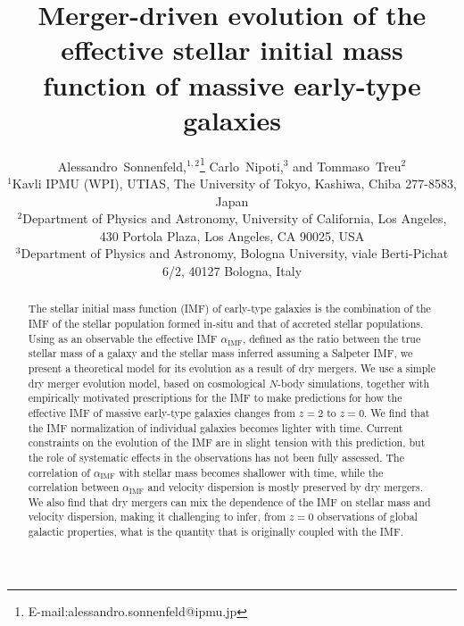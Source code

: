 \documentclass[usenatbib]{mnras}
\def\aimf{\alpha_{\mathrm{IMF}}}
\begin{document}
\title[Evolution of the stellar initial mass function of early-type galaxies]{Merger-driven evolution of the effective stellar initial mass function of massive early-type galaxies}
\author[Sonnenfeld et al.]{
Alessandro~Sonnenfeld,$^{1,2}$\thanks{E-mail:alessandro.sonnenfeld@ipmu.jp}
Carlo~Nipoti,$^{3}$
and Tommaso~Treu$^{2}$
\\
$^{1}$Kavli IPMU (WPI), UTIAS, The University of Tokyo, Kashiwa, Chiba 277-8583, Japan \\
$^{2}$Department of Physics and Astronomy, University of California, Los Angeles, 430 Portola Plaza, Los Angeles, CA 90025, USA \\
$^{3}$Department of Physics and Astronomy, Bologna University, viale Berti-Pichat 6/2, 40127 Bologna, Italy
}

\maketitle

\begin{abstract}
The stellar initial mass function (IMF) of early-type galaxies is the
combination of the IMF of the stellar population formed in-situ and
that of accreted stellar populations.  Using as an observable the
  effective IMF $\aimf$, defined as the ratio between the true stellar
  mass of a galaxy and the stellar mass inferred assuming a Salpeter
  IMF, we present a theoretical model for its evolution as a result
of dry mergers.  We use a simple dry merger evolution model, 
  based on cosmological $N$-body simulations, together with
empirically motivated prescriptions for the IMF to make predictions
for how the effective IMF of massive early-type galaxies changes from
$z=2$ to $z=0$.  We find that the IMF normalization of individual
galaxies becomes lighter with time.  Current constraints on the
evolution of the IMF are in slight tension with this prediction, but
the role of systematic effects in the observations has not been fully
assessed.  The correlation of $\aimf$ with stellar mass becomes
  shallower with time, while the correlation between $\aimf$ and
  velocity dispersion is mostly preserved by dry mergers.  We also
find that dry mergers can mix the dependence of the IMF on stellar
mass and velocity dispersion, making it challenging to infer,
  from $z=0$ observations of global galactic properties, what is the
  quantity that is originally coupled with the IMF.
\end{abstract}
\end{document}
